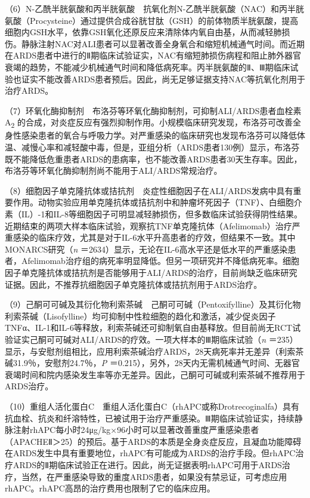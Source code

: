 （6）N-乙酰半胱氨酸和丙半胱氨酸　抗氧化剂N-乙酰半胱氨酸（NAC）和丙半胱氨酸（Procysteine）通过提供合成谷胱甘肽（GSH）的前体物质半胱氨酸，提高细胞内GSH水平，依靠GSH氧化还原反应来清除体内氧自由基，从而减轻肺损伤。静脉注射NAC对ALI患者可以显著改善全身氧合和缩短机械通气时间。而近期在ARDS患者中进行的Ⅱ期临床试验证实，NAC有缩短肺损伤病程和阻止肺外器官衰竭的趋势，不能减少机械通气时间和降低病死率。丙半胱氨酸的Ⅱ、Ⅲ期临床试验也证实不能改善ARDS患者预后。因此，尚无足够证据支持NAC等抗氧化剂用于治疗ARDS。

（7）环氧化酶抑制剂　布洛芬等环氧化酶抑制剂，可抑制ALI/ARDS患者血栓素A\textsubscript{2}
的合成，对炎症反应有强烈抑制作用。小规模临床研究发现，布洛芬可改善全身性感染患者的氧合与呼吸力学。对严重感染的临床研究也发现布洛芬可以降低体温、减慢心率和减轻酸中毒，但是，亚组分析（ARDS患者130例）显示，布洛芬既不能降低危重患者ARDS的患病率，也不能改善ARDS患者30天生存率。因此，布洛芬等环氧化酶抑制剂尚不能用于ALI/ARDS常规治疗。

（8）细胞因子单克隆抗体或拮抗剂　炎症性细胞因子在ALI/ARDS发病中具有重要作用。动物实验应用单克隆抗体或拮抗剂中和肿瘤坏死因子（TNF）、白细胞介素（IL）-1和IL-8等细胞因子可明显减轻肺损伤，但多数临床试验获得阴性结果。近期结束的两项大样本临床试验，观察抗TNF单克隆抗体（Afelimomab）治疗严重感染的临床疗效，尤其是对于IL-6水平升高患者的疗效，但结果不一致。其中MONARCS研究（\emph{n}
＝2634）显示，无论在IL-6高水平还是低水平的严重感染患者，Afelimomab治疗组的病死率明显降低。但另一项研究并不降低病死率。细胞因子单克隆抗体或拮抗剂是否能够用于ALI/ARDS的治疗，目前尚缺乏临床研究证据。因此，不推荐抗细胞因子单克隆抗体或拮抗剂用于ARDS治疗。

（9）己酮可可碱及其衍化物利索茶碱　己酮可可碱（Pentoxifylline）及其衍化物利索茶碱（Lisofylline）均可抑制中性粒细胞的趋化和激活，减少促炎因子TNFα、IL-1和IL-6等释放，利索茶碱还可抑制氧自由基释放。但目前尚无RCT试验证实己酮可可碱对ALI/ARDS的疗效。一项大样本的Ⅲ期临床试验（\emph{n}
＝235）显示，与安慰剂组相比，应用利索茶碱治疗ARDS，28天病死率并无差异（利索茶碱31.9％，安慰剂24.7％，\emph{P}
＝0.215），另外，28天内无需机械通气时间、无器官衰竭时间和院内感染发生率等亦无差异。因此，己酮可可碱或利索茶碱不推荐用于ARDS治疗。

（10）重组人活化蛋白C　重组人活化蛋白C（rhAPC或称Drotrecoginalfa）具有抗血栓、抗炎和纤溶特性，已被试用于治疗严重感染。Ⅲ期临床试验证实，持续静脉注射rhAPC每小时24μg/kg×96小时可以显著改善重度严重感染患者（APACHEⅡ＞25）的预后。基于ARDS的本质是全身炎症反应，且凝血功能障碍在ARDS发生中具有重要地位，rhAPC有可能成为ARDS的治疗手段。但rhAPC治疗ARDS的Ⅱ期临床试验正在进行。因此，尚无证据表明rhAPC可用于ARDS治疗，当然，在严重感染导致的重度ARDS患者，如果没有禁忌证，可考虑应用rhAPC。rhAPC高昂的治疗费用也限制了它的临床应用。

